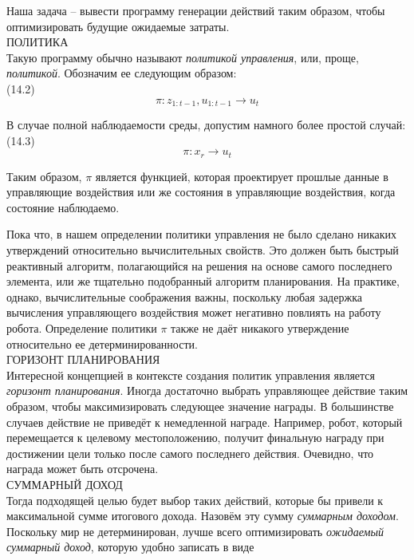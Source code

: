 \documentclass[10pt,a4paper]{article}
\begin{document}
Наша задача – вывести программу генерации действий таким образом, чтобы оптимизировать будущие ожидаемые затраты.\\

ПОЛИТИКА\\
Такую программу обычно называют \textit{политикой управления}, или, проще, \textit{политикой}. Обозначим ее следующим образом:\\

(14.2)
$$\pi:z_{1:t-1},u_{1:t-1}\longrightarrow u_t$$

В случае полной наблюдаемости среды, допустим намного более простой случай:\\

(14.3)
$$\pi:x_r\longrightarrow u_t$$

Таким образом, $\pi$ является функцией, которая проектирует прошлые данные в управляющие воздействия или же состояния в управляющие воздействия, когда состояние наблюдаемо.

Пока что, в нашем определении политики управления не было сделано никаких утверждений относительно вычислительных свойств. Это должен быть быстрый реактивный алгоритм, полагающийся на решения на основе самого последнего  элемента, или же тщательно подобранный алгоритм планирования. На практике, однако, вычислительные соображения важны, поскольку любая задержка вычисления управляющего воздействия может негативно повлиять на работу робота. Определение политики $\pi$ также не даёт никакого утверждение относительно ее детерминированности.\\

ГОРИЗОНТ ПЛАНИРОВАНИЯ\\

Интересной концепцией в контексте создания политик управления является \textit{горизонт планирования}. Иногда достаточно выбрать управляющее действие таким образом, чтобы максимизировать следующее значение награды. В большинстве случаев действие не приведёт к немедленной награде. Например, робот, который перемещается к целевому местоположению, получит финальную награду при достижении цели только после самого последнего действия. Очевидно, что награда может быть отсрочена.\\ 
СУММАРНЫЙ ДОХОД\\
Тогда подходящей целью будет выбор таких действий, которые бы привели к максимальной сумме итогового дохода. Назовём эту сумму \textit{суммарным доходом}. Поскольку мир не детерминирован, лучше всего оптимизировать \textit{ожидаемый суммарный доход}, которую удобно записать в виде\\
\end{document}
